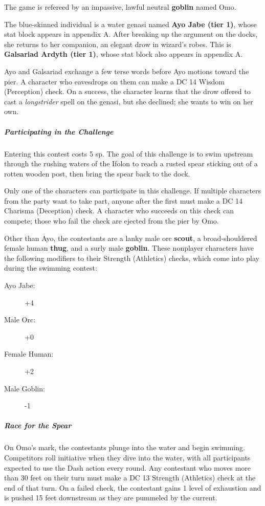 \documentclass[10pt,a4paper,twoside,bg=print,twocolumn,openany,nodeprecatedcode]{dndbook}
\begin{document}
The game is refereed by an impassive, lawful neutral \textbf{goblin} named Omo.

The blue-skinned individual is a water genasi named \textbf{Ayo Jabe (tier 1)}, whose stat block appears in appendix A. After breaking up the argument on the docks, she returns to her companion, an elegant drow in wizard's robes. This is \textbf{Galsariad Ardyth (tier 1)}, whose stat block also appears in appendix A.

Ayo and Galsariad exchange a few terse words before Ayo motions toward the pier. A character who eavesdrops on them can make a DC 14 Wisdom (Perception) check. On a success, the character learns that the drow offered to cast a \textit{longstrider} spell on the genasi, but she declined; she wants to win on her own.

\subparagraph{Participating in the Challenge}
Entering this contest costs 5 sp. The goal of this challenge is to swim upstream through the rushing waters of the Ifolon to reach a rusted spear sticking out of a rotten wooden post, then bring the spear back to the dock.

Only one of the characters can participate in this challenge. If multiple characters from the party want to take part, anyone after the first must make a DC 14 Charisma (Deception) check. A character who succeeds on this check can compete; those who fail the check are ejected from the pier by Omo.

Other than Ayo, the contestants are a lanky male orc \textbf{scout}, a broad-shouldered female human \textbf{thug}, and a surly male \textbf{goblin}. These nonplayer characters have the following modifiers to their Strength (Athletics) checks, which come into play during the swimming contest:


\begin{description}
\item[Ayo Jabe:]
+4
\item[Male Orc:]
+0
\item[Female Human:]
+2
\item[Male Goblin:]
-1
\end{description}

\subparagraph{Race for the Spear}
On Omo's mark, the contestants plunge into the water and begin swimming. Competitors roll initiative when they dive into the water, with all participants expected to use the Dash action every round. Any contestant who moves more than 30 feet on their turn must make a DC 13 Strength (Athletics) check at the end of that turn. On a failed check, the contestant gains 1 level of exhaustion and is pushed 15 feet downstream as they are pummeled by the current.
\end{document}
